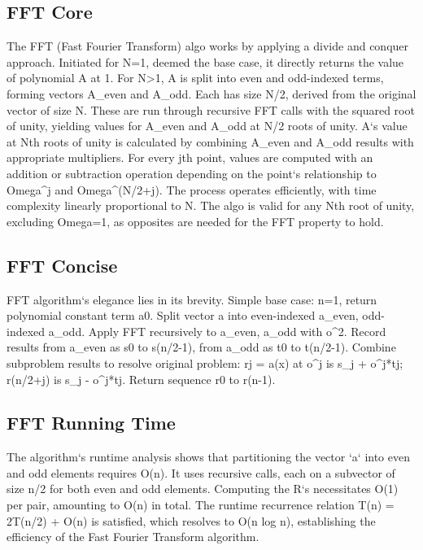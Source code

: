 \subsection*{FFT  Core}
The FFT (Fast Fourier Transform) algo works by applying a divide and conquer approach.
Initiated for N=1, deemed the base case, it directly returns the value of polynomial A at 1.
For N\textgreater{}1, A is split into even and odd-indexed terms, forming vectors A\_even and A\_odd.
Each has size N/2, derived from the original vector of size N\@.
These are run through recursive FFT calls with the squared root of unity, yielding values for A\_even and A\_odd at N/2 roots of unity.
A`s value at Nth roots of unity is calculated by combining A\_even and A\_odd results with appropriate multipliers.
For every jth point, values are computed with an addition or subtraction operation depending on the point`s relationship to Omega\textasciicircum{}j and Omega\textasciicircum{}(N/2+j).
The process operates efficiently, with time complexity linearly proportional to N\@.
The algo is valid for any Nth root of unity, excluding Omega=1, as opposites are needed for the FFT property to hold.

\subsection*{FFT  Concise}
FFT algorithm`s elegance lies in its brevity.
Simple base case: n=1, return polynomial constant term a0.
Split vector a into even-indexed a\_even, odd-indexed a\_odd.
Apply FFT recursively to a\_even, a\_odd with o\textasciicircum{}2.
Record results from a\_even as s0 to s(n/2-1), from a\_odd as t0 to t(n/2-1).
Combine subproblem results to resolve original problem: rj = a(x) at o\textasciicircum{}j is s\_j + o\textasciicircum{}j*tj; r(n/2+j) is s\_j - o\textasciicircum{}j*tj.
Return sequence r0 to r(n-1).

\subsection*{FFT  Running Time}
The algorithm`s runtime analysis shows that partitioning the vector `a` into even and odd elements requires O(n).
It uses recursive calls, each on a subvector of size n/2 for both even and odd elements.
Computing the R`s necessitates O(1) per pair, amounting to O(n) in total.
The runtime recurrence relation T(n) = 2T(n/2) + O(n) is satisfied, which resolves to O(n log n), establishing the efficiency of the Fast Fourier Transform algorithm.

